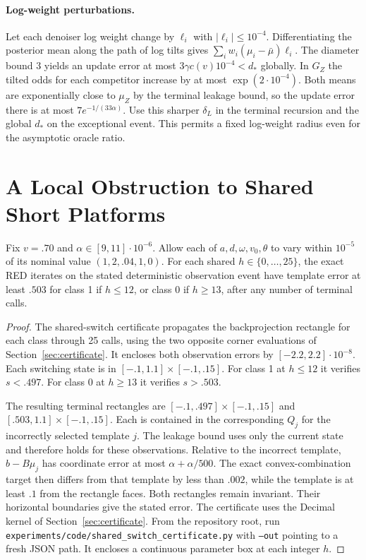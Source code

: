 \paragraph{Log-weight perturbations.}
Let each denoiser log weight change by $\ell_i$ with $|\ell_i|\le10^{-4}$. Differentiating the posterior mean along the path of log tilts gives $\sum_i w_i(\mu_i-\bar\mu)\ell_i$. The diameter bound $3$ yields an update error at most $3\gamma c(v)10^{-4}<d_*$ globally. In $G_Z$ the tilted odds for each competitor increase by at most $\exp(2\cdot10^{-4})$. Both means are exponentially close to $\mu_Z$ by the terminal leakage bound, so the update error there is at most $7e^{-1/(33\alpha)}$. Use this sharper $\delta_L$ in the terminal recursion and the global $d_*$ on the exceptional event. This permits a fixed log-weight radius even for the asymptotic oracle ratio.

\section{A Local Obstruction to Shared Short Platforms}
\begin{proposition}\label{prop:shared_short}
Fix $v=.70$ and $\alpha\in[9,11]\cdot10^{-6}$. Allow each of $a,d,\omega,v_0,\theta$ to vary within $10^{-5}$ of its nominal value $(1,2,.04,1,0)$. For each shared $h\in\{0,\ldots,25\}$, the exact RED iterates on the stated deterministic observation event have template error at least $.503$ for class 1 if $h\le12$, or class 0 if $h\ge13$, after any number of terminal calls.
\end{proposition}
\begin{proof}
The shared-switch certificate propagates the backprojection rectangle for each class through 25 calls, using the two opposite corner evaluations of Section~\ref{sec:certificate}. It encloses both observation errors by $[-2.2,2.2]\cdot10^{-8}$. Each switching state is in $[-.1,1.1]\times[-.1,.15]$. For class 1 at $h\le12$ it verifies $s<.497$. For class 0 at $h\ge13$ it verifies $s>.503$.

The resulting terminal rectangles are $[-.1,.497]\times[-.1,.15]$ and $[.503,1.1]\times[-.1,.15]$. Each is contained in the corresponding $Q_j$ for the incorrectly selected template $j$. The leakage bound uses only the current state and therefore holds for these observations. Relative to the incorrect template, $b-B\mu_j$ has coordinate error at most $\alpha+\alpha/500$. The exact convex-combination target then differs from that template by less than $.002$, while the template is at least $.1$ from the rectangle faces. Both rectangles remain invariant. Their horizontal boundaries give the stated error. The certificate uses the Decimal kernel of Section~\ref{sec:certificate}. From the repository root, run \texttt{experiments/code/shared\_switch\_certificate.py} with \texttt{--out} pointing to a fresh JSON path. It encloses a continuous parameter box at each integer $h$.
\end{proof}
